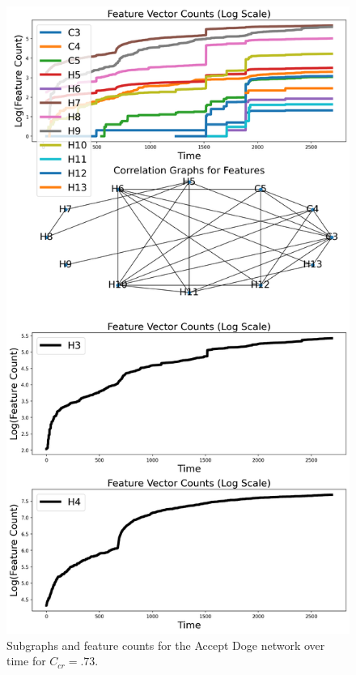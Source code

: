 \documentclass[a4paper,11pt]{article}
\begin{document}
\begin{figure}[h!]
    \includegraphics[width=.85\linewidth]{Images/AcceptDoge/connected_components.png}
    \centering
    \caption{Subgraphs and feature counts for the Accept Doge network over time for $C_{cr}=.73$.}
\end{figure}
\clearpage
\pagebreak
\end{document}
